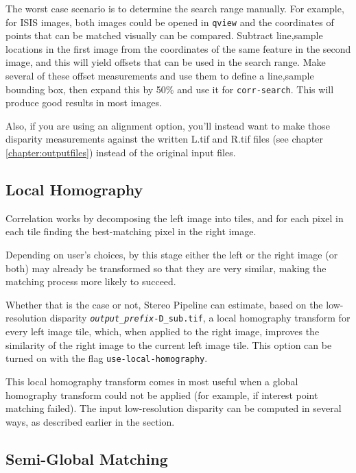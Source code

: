 The worst case scenario is to determine the search range manually. For
example, for ISIS images, both images could be opened in \texttt{qview}
and the coordinates of points that can be matched visually can be
compared. Subtract line,sample locations in the first image from the
coordinates of the same feature in the second image, and this will yield
offsets that can be used in the search range.  Make several of these
offset measurements and use them to define a line,sample bounding box,
then expand this by 50\% and use it for \texttt{corr-search}.  This will
produce good results in most images.

Also, if you are using an alignment option, you'll instead want to
make those disparity measurements against the written L.tif and R.tif
files (see chapter \ref{chapter:outputfiles}) instead of the original input files.

\subsection{Local Homography}
\label{sec:local_hom}

Correlation works by decomposing the left image into tiles, and for each
pixel in each tile finding the best-matching pixel in the right image.

Depending on user's choices, by this stage either the left or the right
image (or both) may already be transformed so that they are very
similar, making the matching process more likely to succeed.

Whether that is the case or not, Stereo Pipeline can estimate, based on
the low-resolution disparity
\texttt{\textit{output\_prefix}-D\_sub.tif}, a local homography transform
for every left image tile, which, when applied to the right image,
improves the similarity of the right image to the current left image tile. This
option can be turned on with the flag \texttt{use-local-homography}.

This local homography transform comes in most useful when a global
homography transform could not be applied (for example, if interest
point matching failed). The input low-resolution disparity can be
computed in several ways, as described earlier in the section.

\subsection{Semi-Global Matching}
\label{sec:sgm}

